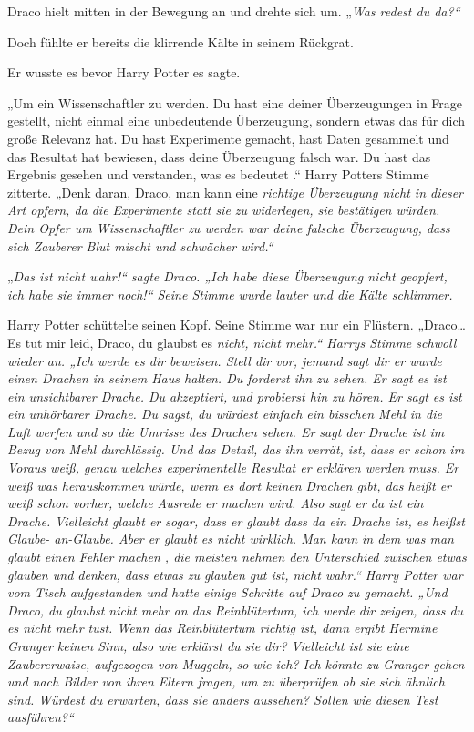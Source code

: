 {Draco hielt mitten in der Bewegung an und drehte sich um. „\emph{Was redest du da?“}

Doch fühlte er bereits die klirrende Kälte in seinem Rückgrat.

Er wusste es bevor Harry Potter es sagte.

„Um ein Wissenschaftler zu werden. Du hast eine deiner Überzeugungen in Frage gestellt, nicht einmal eine unbedeutende Überzeugung, sondern etwas das für dich große Relevanz hat. Du hast Experimente gemacht, hast Daten gesammelt und das Resultat hat bewiesen, dass deine Überzeugung falsch war. Du hast das Ergebnis gesehen und verstanden, was es bedeutet .“ Harry Potters Stimme zitterte. „Denk daran, Draco, man kann eine \emph{richtige Überzeugung nicht in dieser Art opfern, da die Experimente statt sie zu widerlegen, sie bestätigen würden. Dein Opfer um Wissenschaftler zu werden war deine \emph{falsche} Überzeugung, dass sich Zauberer Blut mischt und schwächer wird.“}

„\emph{Das ist nicht wahr!“ sagte Draco. „Ich habe diese Überzeugung nicht geopfert, ich habe sie immer noch!“ Seine Stimme wurde lauter und die Kälte schlimmer.}

Harry Potter schüttelte seinen Kopf. Seine Stimme war nur ein Flüstern. „Draco… Es tut mir leid, Draco, du glaubst es \emph{nicht, nicht mehr.“ Harrys Stimme schwoll wieder an. „Ich werde es dir beweisen. Stell dir vor, jemand sagt dir er wurde einen Drachen in seinem Haus halten. Du forderst ihn zu sehen. Er sagt es ist ein unsichtbarer Drache. Du akzeptiert, und probierst hin zu hören. Er sagt es ist ein unhörbarer Drache. Du sagst, du würdest einfach ein bisschen Mehl in die Luft werfen und so die Umrisse des Drachen sehen. Er sagt der Drache ist im Bezug von Mehl durchlässig. Und das Detail, das ihn verrät, ist, dass er schon im Voraus weiß, genau welches experimentelle Resultat er erklären werden muss. Er weiß was herauskommen würde, wenn es dort keinen Drachen gibt, das heißt er weiß schon vorher, welche Ausrede er machen wird. Also sagt er da ist ein Drache. Vielleicht glaubt er sogar, dass er glaubt dass da ein Drache ist, es heißst Glaube- an-Glaube. Aber er glaubt es nicht wirklich. Man kann in dem was man glaubt einen Fehler machen , die meisten nehmen den Unterschied zwischen etwas glauben und denken, dass etwas zu glauben gut ist, nicht wahr.“ Harry Potter war vom Tisch aufgestanden und hatte einige Schritte auf Draco zu gemacht. „Und Draco, du glaubst nicht mehr an das Reinblütertum, ich werde dir zeigen, dass du es nicht mehr tust. Wenn das Reinblütertum richtig ist, dann ergibt Hermine Granger keinen Sinn, also wie erklärst du sie dir? Vielleicht ist sie eine Zaubererwaise, aufgezogen von Muggeln, so wie ich? Ich könnte zu Granger gehen und nach Bilder von ihren Eltern fragen, um zu überprüfen ob sie sich ähnlich sind. Würdest du erwarten, dass sie anders aussehen? Sollen wie diesen Test ausführen?“}

}
